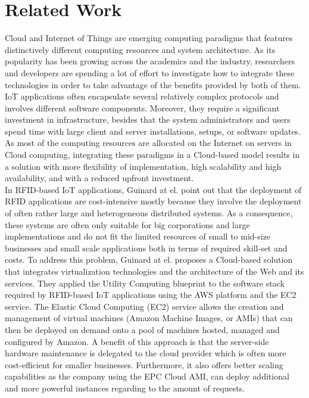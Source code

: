 \section{Related Work}
\label{sec:Related Work}
Cloud and Internet of Things are emerging computing paradigms that features distinctively different computing resources
and system architecture. As its popularity has been growing across the academics and the industry, researchers and developers
are spending a lot of effort to investigate how to integrate these technologies in order to take advantage of the benefits
provided by both of them.\\
IoT applications often encapsulate several relatively complex protocols and involves different software components. Moreover,
they require a significant investment in infrastructure, besides that the system administrators and users spend time with large
client and server installations, setups, or software updates. As most of the computing resources are allocated on the Internet on servers
in Cloud computing, integrating these paradigms in a Cloud-based model results in a solution with more flexibility of implementation,
high scalability and high availability, and with a reduced upfront investment.\\

In RFID-based IoT applications, Guinard at el. \cite{guinard2011cloud} point out that the deployment of RFID applications are cost-intensive mostly
because they involve the deployment of often rather large and heterogeneous distributed systems. As a consequence, these systems are often only
suitable for big corporations and large implementations and do not fit the limited resources of small to mid-size businesses and small scale
applications both in terms of required skill-set and costs. To address this problem, Guinard at el. proposes a Cloud-based solution that
integrates virtualization technologies and the architecture of the Web and its services. They applied the Utility Computing blueprint to the
software stack required by RFID-based IoT applications using the AWS platform and the EC2 service. The Elastic Cloud Computing (EC2) service
allows the creation and management of virtual machines (Amazon Machine Images, or AMIs) that can then be deployed on
demand onto a pool of machines hosted, managed and configured by Amazon. A benefit of this approach is that the server-side hardware
maintenance is delegated to the cloud provider which is often more cost-efficient for smaller businesses. Furthermore,
it also offers better scaling capabilities as the company using the EPC Cloud AMI, can deploy additional and more powerful instances regarding
to the amount of requests.\\

